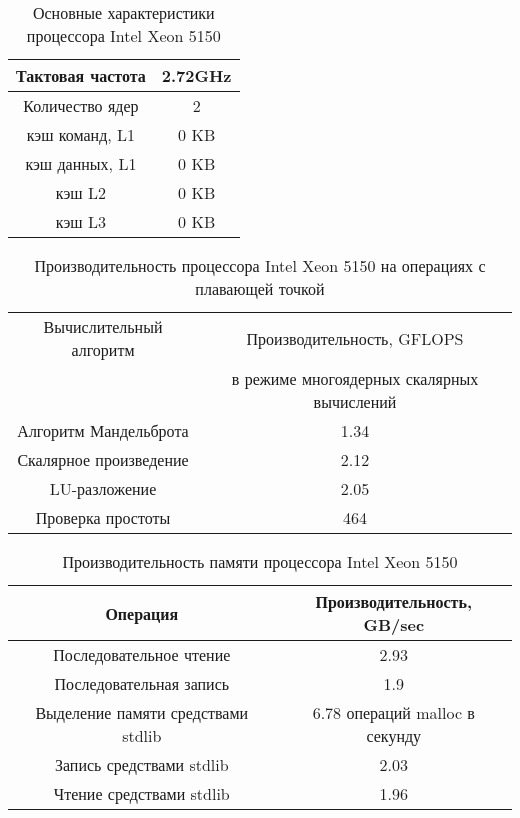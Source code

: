 \begin{table}[ht]
	\begin{center}
		\caption{Основные характеристики процессора Intel Xeon  5150}
		\begin{tabular}{|c|c|}
			\hline	
			Тактовая частота & 2.72GHz   \\ \hline
			Количество ядер & 2 	     \\ \hline
			кэш команд, L1 &  0 KB      \\ \hline
			кэш данных, L1 &  0 KB       \\ \hline
			кэш L2         &  0 KB      \\ \hline
			кэш L3         &  0 KB        \\ \hline
		\end{tabular}
	\end{center} 	
\end{table} 	

\begin{table}[ht]
	\begin{center}
		\caption{Производительность процессора Intel Xeon  5150 на операциях с плавающей точкой}
		\begin{tabular}{|c|c|}
			\hline	
			Вычислительный алгоритм &  Производительность, GFLOPS \\ 
			& в режиме многоядерных скалярных вычислений \\ \hline
			Алгоритм Мандельброта  &  1.34 	\\ \hline
			Скалярное произведение &  2.12   \\ \hline
			LU-разложение          &  2.05   \\ \hline
			Проверка простоты      &  464  \\ \hline 
			
			
		\end{tabular}
	\end{center} 	
\end{table} 	

\begin{table}[ht]
	\begin{center}
		\caption{Производительность памяти процессора Intel Xeon 5150}
		\begin{tabular}{|c|c|}
			\hline	
			Операция  &  Производительность, GB/sec \\ \hline
			Последовательное чтение &  2.93 	\\  \hline
			Последовательная запись &  1.9   \\  \hline
			Выделение памяти средствами stdlib &  6.78 операций malloc в секунду  \\  \hline
			Запись средствами stdlib  & 2.03  \\ \hline
			Чтение средствами stdlib  & 1.96  \\ \hline 
		\end{tabular}
	\end{center} 	
\end{table} 	


